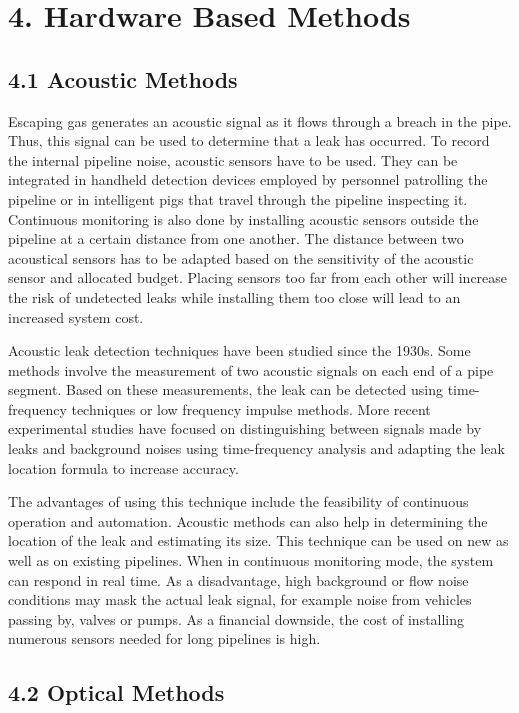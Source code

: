 \section*{4. Hardware Based Methods}

\subsection*{4.1 Acoustic Methods}

Escaping gas generates an acoustic signal as it flows through a breach in the pipe. Thus, this signal can be used to determine that a leak has occurred. To record the internal pipeline noise, acoustic sensors have to be used. They can be integrated in handheld detection devices employed by personnel patrolling the pipeline or in intelligent pigs that travel through the pipeline inspecting it. Continuous monitoring is also done by installing acoustic sensors outside the pipeline at a certain distance from one another. The distance between two acoustical sensors has to be adapted based on the sensitivity of the acoustic sensor and allocated budget. Placing sensors too far from each other will increase the risk of undetected leaks while installing them too close will lead to an increased system cost.

Acoustic leak detection techniques have been studied since the 1930s. Some methods involve the measurement of two acoustic signals on each end of a pipe segment. Based on these measurements, the leak can be detected using time-frequency techniques or low frequency impulse methods. More recent experimental studies have focused on distinguishing between signals made by leaks and background noises using time-frequency analysis and adapting the leak location formula to increase accuracy.

The advantages of using this technique include the feasibility of continuous operation and automation. Acoustic methods can also help in determining the location of the leak and estimating its size. This technique can be used on new as well as on existing pipelines. When in continuous monitoring mode, the system can respond in real time. As a disadvantage, high background or flow noise conditions may mask the actual leak signal, for example noise from vehicles passing by, valves or pumps. As a financial downside, the cost of installing numerous sensors needed for long pipelines is high.

\subsection*{4.2 Optical Methods}

